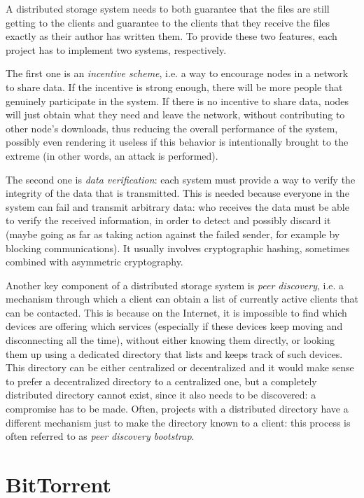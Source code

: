 \documentclass[mscthesis]{usiinfthesis}
\begin{document}
A distributed storage system needs to both guarantee that the files are still getting to the clients and guarantee to the clients that they receive the files exactly as their author has written them. To provide these two features, each project has to implement two systems, respectively.

The first one is an \emph{incentive scheme}, i.e. a way to encourage nodes in a network to share data. If the incentive is strong enough, there will be more people that genuinely participate in the system. If there is no incentive to share data, nodes will just obtain what they need and leave the network, without contributing to other node's downloads, thus reducing the overall performance of the system, possibly even rendering it useless if this behavior is intentionally brought to the extreme (in other words, an attack is performed).

The second one is \emph{data verification}: each system must provide a way to verify the integrity of the data that is transmitted. This is needed because everyone in the system can fail and transmit arbitrary data: who receives the data must be able to verify the received information, in order to detect and possibly discard it (maybe going as far as taking action against the failed sender, for example by blocking communications). It usually involves cryptographic hashing, sometimes combined with asymmetric cryptography.

Another key component of a distributed storage system is \emph{peer discovery}, i.e. a mechanism through which a client can obtain a list of currently active clients that can be contacted. This is because on the Internet, it is impossible to find which devices are offering which services (especially if these devices keep moving and disconnecting all the time), without either knowing them directly, or looking them up using a dedicated directory that lists and keeps track of such devices. This directory can be either centralized or decentralized and it would make sense to prefer a decentralized directory to a centralized one, but a completely distributed directory cannot exist, since it also needs to be discovered: a compromise has to be made. Often, projects with a distributed directory have a different mechanism just to make the directory known to a client: this process is often referred to as \textit{peer discovery bootstrap}.

\section{BitTorrent}\label{proj:bittorrent}
\end{document}
